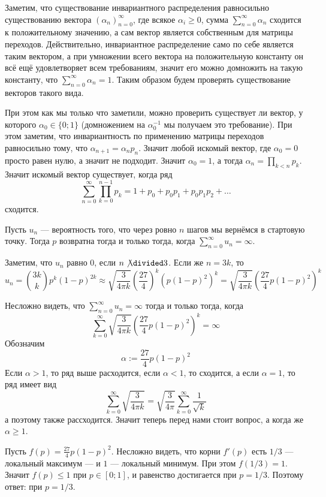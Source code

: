 \documentclass[12pt,a4paper]{article}
\begin{document}
    \begin{enumproblem}
        Заметим, что существование инвариантного распределения равносильно существованию вектора $(\alpha_n)_{n=0}^\infty$, где всякое $\alpha_i \geqslant 0$, сумма $\sum_{n=0}^\infty \alpha_n$ сходится к положительному значению, а сам вектор является собственным для матрицы переходов. Действительно, инвариантное распределение само по себе является таким вектором, а при умножении всего вектора на положительную константу он всё ещё удовлетворяет всем требованиям, значит его можно домножить на такую константу, что $\sum_{n=0}^\infty \alpha_n = 1$. Таким образом будем проверять существование векторов такого вида.

        При этом как мы только что заметили, можно проверить существует ли вектор, у которого $\alpha_0 \in \{0; 1\}$ (домножением на $\alpha_0^{-1}$ мы получаем это требование). При этом заметим, что инвариантность по применению матрицы переходов равносильно тому, что $\alpha_{n+1} = \alpha_n p_n$. Значит любой искомый вектор, где $\alpha_0 = 0$ просто равен нулю, а значит не подходит. Значит $\alpha_0 = 1$, а тогда $\alpha_n = \prod_{k < n} p_k$. Значит искомый вектор существует, когда ряд
        \[\sum_{n=0}^\infty \prod_{k=0}^{n-1} p_k = 1 + p_0 + p_0 p_1 + p_0 p_1 p_2 + \dots\]
        сходится.
    \end{enumproblem}

    \begin{enumproblem}
        Пусть $u_n$ --- вероятность того, что через ровно $n$ шагов мы вернёмся в стартовую точку. Тогда $p$ возвратна тогда и только тогда, когда $\sum_{n=0}^\infty u_n = \infty$.

        Заметим, что $u_n$ равно $0$, если $n \not\divided 3$. Если же $n = 3k$, то
        \[u_n = \binom{3k}{k} p^k (1-p)^{2k} \approx \sqrt{\frac{3}{4 \pi k}} \left(\frac{27}{4}\right)^k (p(1-p)^2)^k = \sqrt{\frac{3}{4 \pi k}} \left(\frac{27}{4}p(1-p)^2\right)^k\]

        Несложно видеть, что $\sum_{n=0}^\infty u_n = \infty$ тогда и только тогда, когда
        \[\sum_{k=0}^\infty \sqrt{\frac{3}{4 \pi k}} \left(\frac{27}{4}p(1-p)^2\right)^k = \infty\]
        Обозначим
        \[\alpha := \frac{27}{4}p(1-p)^2\]
        Если $\alpha > 1$, то ряд выше расходится, если $\alpha < 1$, то сходится, а если $\alpha = 1$, то ряд имеет вид
        \[\sum_{k=0}^\infty \sqrt{\frac{3}{4 \pi k}} = \sqrt{\frac{3}{4 \pi}} \sum_{k=0}^\infty \frac{1}{\sqrt{k}}\]
        а поэтому также рассходится. Значит теперь перед нами стоит вопрос, а когда же $\alpha \geqslant 1$.

        Пусть $f(p) = \frac{27}{4}p(1-p)^2$. Несложно видеть, что корни $f'(p)$ есть $1/3$ --- локальный максимум --- и $1$ --- локальный минимум. При этом $f(1/3) = 1$. Значит $f(p) \leqslant 1$ при $p \in [0; 1]$, и равенство достигается при $p = 1/3$. Поэтому ответ: при $p = 1/3$.
    \end{enumproblem}
\end{document}
